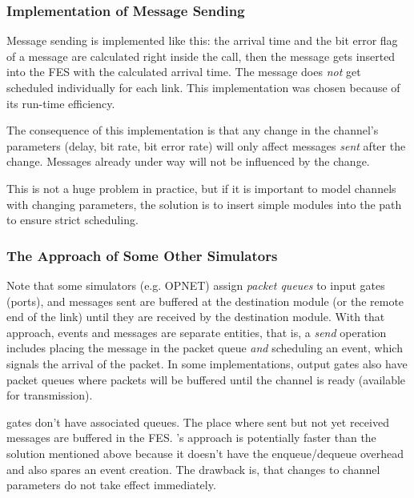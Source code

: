 \subsubsection{Implementation of Message Sending}

Message sending is implemented like this: the arrival time
and the bit error flag of a message are calculated right inside
the  call, then the message gets inserted into the FES
with the calculated arrival time. The message does \textit{not} get scheduled
individually for each link. This implementation was chosen because of its
run-time efficiency.

\begin{note}
   The consequence of this implementation is that any change in the
   channel's parameters (delay, bit rate, bit error rate) will only affect
   messages \textit{sent} after the change. Messages already under way will not
   be influenced by the change.

   This is not a huge problem in practice, but if it is important to model
   channels with changing parameters, the solution is to insert simple modules
   into the path to ensure strict scheduling.
\end{note}


\subsubsection{The Approach of Some Other Simulators}

Note that some simulators (e.g. OPNET) assign \textit{packet queues}
to input gates (ports), and messages sent are buffered at the
destination module (or the remote end of the link) until they are
received by the destination module. With that approach, events and
messages are separate entities, that is, a \textit{send} operation
includes placing the message in the packet queue \textit{and} scheduling
an event, which signals the arrival of the packet. In some implementations,
output gates also have packet queues where packets will be buffered until
the channel is ready (available for transmission).

{\opp} gates don't have associated queues. The place
where sent but not yet received messages are buffered in the
FES.  {\opp}'s approach is potentially faster
than the solution mentioned above because it doesn't have the
enqueue/dequeue overhead and also spares an event creation. The
drawback is, that changes to channel parameters do not take effect
immediately.

